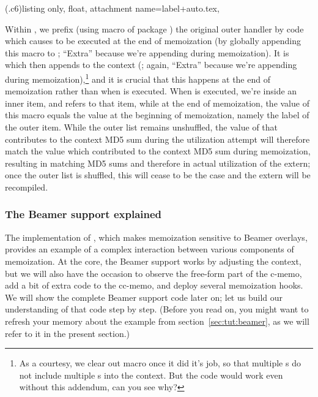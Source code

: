 \documentclass[a4paper,11pt]{article}
\begin{document}
(.c6){listing only, float,
  attachment name=label+auto.tex,
}

Within , we prefix (using macro  of package
) the original outer handler  by code
which causes  to be executed at the end of memoization
(by globally appending this macro to ;
``Extra'' because we're appending during memoization).  It is
 which then appends  to the
context (; again, ``Extra'' because we're appending
during memoization),\footnote{As a courtesy, we clear out macro
   once it did it's job, so that multiple s
  do not include multiple s into the context.  But the code
  would work even without this addendum, can you see why?} and it is crucial
that this happens at the end of memoization rather than when  is
executed.  When  is executed, we're inside an inner item, and
 refers to that item, while at the end of memoization, the
value of this macro equals the value at the beginning of memoization, namely
the label of the outer item.  While the outer list remains unshuffled, the
value of  that contributes to the context MD5 sum during
the utilization attempt will therefore match the value which contributed to the
context MD5 sum during memoization, resulting in matching MD5 sums and
therefore in actual utilization of the extern; once the outer list is shuffled,
this will cease to be the case and the extern will be recompiled.


\subsubsection{The Beamer support explained}
\label{sec:per-overlay}

The implementation of , which makes memoization sensitive
to Beamer overlays, provides an example of a complex interaction between
various components of memoization.  At the core, the Beamer support works by
adjusting the context, but we will also have the occasion to observe the
free-form part of the c-memo, add a bit of extra code to the cc-memo, and
deploy several memoization hooks.  We will show the complete Beamer support
code later on; let us build our understanding of that code step by step.
(Before you read on, you might want to refresh your memory about the 
example from section~\ref{sec:tut:beamer}, as we will refer to it in the
present section.)
\end{document}
